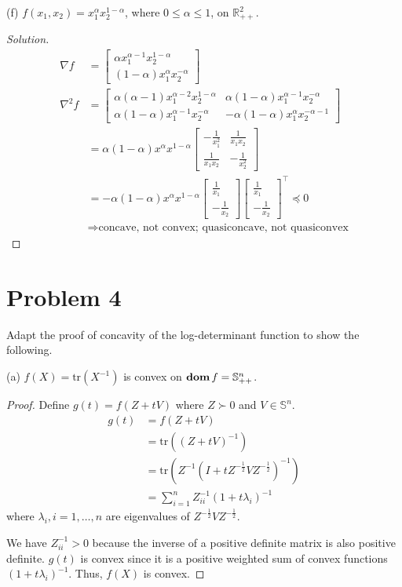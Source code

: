\documentclass[11pt]{article}
\newenvironment{solution}
  {\renewcommand\qedsymbol{$\square$}\begin{proof}[Solution]}
  {\end{proof}}
\newcommand{\grad}{\nabla}
\newcommand{\hess}{\nabla^2}
\newcommand{\tr}{\text{tr}}
\newcommand{\RR}{\mathbb{R}}
\newcommand{\bS}{\mathbb{S}}
\newcommand{\half}{\frac{1}{2}}
\newcommand{\T}{^\top}
\begin{document}
(f) $f\left(x_1, x_2\right)=x_1^\alpha x_2^{1-\alpha}$, where $0 \leq \alpha \leq 1$, on $\RR_{++}^2$.
\begin{solution}
  \begin{align*}
    \grad f &= 
    \begin{bmatrix}
      \alpha x_1^{\alpha-1} x_2^{1-\alpha} \\ (1-\alpha) x_1^\alpha x_2^{-\alpha}
    \end{bmatrix}\\
    \hess f &= 
    \begin{bmatrix}
      \alpha(\alpha-1) x_1^{\alpha-2} x_2^{1-\alpha} & \alpha(1-\alpha) x_1^{\alpha-1} x_2^{-\alpha}\\
      \alpha(1-\alpha) x_1^{\alpha-1} x_2^{-\alpha} & -\alpha(1-\alpha) x_1^{\alpha} x_2^{-\alpha - 1}
    \end{bmatrix}\\
    &= \alpha(1-\alpha)x^{\alpha}x^{1-\alpha}
    \begin{bmatrix}
      -\frac{1}{x_1^2} & \frac{1}{x_1x_2}\\ \frac{1}{x_1x_2} & -\frac{1}{x_2^2}
    \end{bmatrix}\\
    &= -\alpha(1-\alpha)x^{\alpha}x^{1-\alpha}
    \begin{bmatrix}
      \frac{1}{x_1}\\ -\frac{1}{x_2}
    \end{bmatrix}
    \begin{bmatrix}
      \frac{1}{x_1}\\ -\frac{1}{x_2}
    \end{bmatrix}\T \preceq 0\\
    &\Rightarrow \text{concave, not convex; quasiconcave, not quasiconvex}
  \end{align*}
\end{solution}


\clearpage
\section*{Problem 4}
Adapt the proof of concavity of the log-determinant function to show the following.

(a) $f(X) = \tr(X^{-1})$ is convex on $\dom f = \bS^n_{++}$.
\begin{proof}
  Define $g(t) = f(Z+tV)$ where $Z\succ 0$ and $V\in\bS^n$.
  \begin{align*}
    g(t) 
    &= f(Z+tV)\\
    &= \tr\left((Z+tV)^{-1}\right)\\
    &= \tr\left(Z^{-1}\left(I+tZ^{-\half}VZ^{-\half}\right)^{-1}\right)\\
    &= \sum_{i=1}^{n} Z^{-1}_{ii} (1 + t\lambda_i)^{-1}
  \end{align*}
  where $\lambda_i, i=1, \dots, n$ are eigenvalues of $Z^{-\half} V Z^{-\half}$. 
  
  We have $Z^{-1}_{ii} > 0$ because the inverse of a positive definite matrix is also positive definite. $g(t)$ is convex since it is a positive weighted sum of convex functions $(1 + t\lambda_i)^{-1}$. Thus, $f(X)$ is convex. 
\end{proof}
\end{document}

